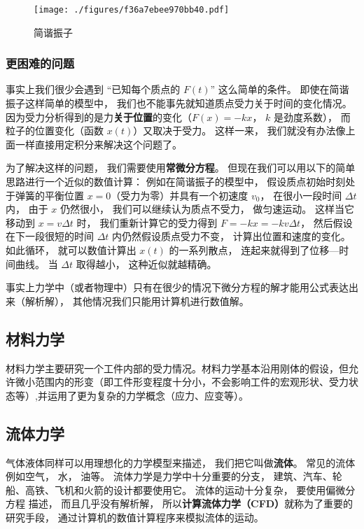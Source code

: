 \begin{figure}[ht]
\centering
\texttt{[image: ./figures/f36a7ebee970bb40.pdf]}
\caption{简谐振子} \label{fig_CM0_2}
\end{figure}

\subsubsection{更困难的问题}
事实上我们很少会遇到 “已知每个质点的 $F(t)$” 这么简单的条件。 即使在简谐振子这样简单的模型中， 我们也不能事先就知道质点受力关于时间的变化情况。 因为受力分析得到的是力\textbf{关于位置}的变化（$F(x) = -k x$， $k$ 是劲度系数）， 而粒子的位置变化（函数 $x(t)$）又取决于受力。 这样一来， 我们就没有办法像上面一样直接用定积分来解决这个问题了。

为了解决这样的问题， 我们需要使用\textbf{常微分方程}。 但现在我们可以用以下的简单思路进行一个近似的数值计算： 例如在简谐振子的模型中， 假设质点初始时刻处于弹簧的平衡位置 $x = 0$（受力为零）并具有一个初速度 $v_0$， 在很小一段时间 $\Delta t$ 内， 由于 $x$ 仍然很小， 我们可以继续认为质点不受力， 做匀速运动。 这样当它移动到 $x = v\Delta t$ 时， 我们重新计算它的受力得到 $F = -kx = -k v \Delta t$， 然后假设在下一段很短的时间 $\Delta t$ 内仍然假设质点受力不变， 计算出位置和速度的变化。 如此循环， 就可以数值计算出 $x(t)$ 的一系列散点， 连起来就得到了位移—时间曲线。 当 $\Delta t$ 取得越小， 这种近似就越精确。

事实上力学中（或者物理中）只有在很少的情况下微分方程的解才能用公式表达出来（解析解）， 其他情况我们只能用计算机进行数值解。

\subsection{材料力学}
材料力学主要研究一个工件内部的受力情况。材料力学基本沿用刚体的假设，但允许微小范围内的形变（即工件形变程度十分小，不会影响工件的宏观形状、受力状态等）,并运用了更为复杂的力学概念（应力、应变等）。


\subsection{流体力学}
气体液体同样可以用理想化的力学模型来描述， 我们把它叫做\textbf{流体}。 常见的流体例如空气， 水， 油等。 流体力学是力学中十分重要的分支， 建筑、汽车、轮船、高铁、飞机和火箭的设计都要使用它。 流体的运动十分复杂， 要使用偏微分方程%
描述， 而且几乎没有解析解， 所以\textbf{计算流体力学（CFD）}就称为了重要的研究手段， 通过计算机的数值计算程序来模拟流体的运动。

